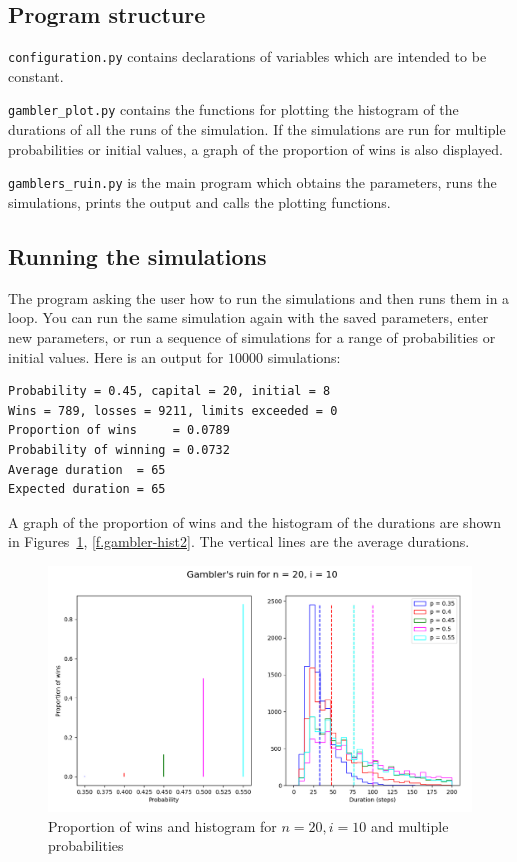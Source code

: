 \subsection{Program structure}

\verb+configuration.py+ contains declarations of variables which are intended to be constant.

\verb+gambler_plot.py+ contains the functions for plotting the histogram of the durations of all the runs of the simulation. If the simulations are run for multiple probabilities or initial values, a graph of the proportion of wins is also displayed.

\verb+gamblers_ruin.py+ is the main program which obtains the parameters, runs the simulations, prints the output and calls the plotting functions.

\subsection{Running the simulations}

The program asking the user how to run the simulations and then runs them in a loop. You can run the same simulation again with the saved parameters, enter new parameters, or run a sequence of simulations for a range of probabilities or initial values. Here is an output for $10000$ simulations:
\begin{verbatim}
Probability = 0.45, capital = 20, initial = 8
Wins = 789, losses = 9211, limits exceeded = 0
Proportion of wins     = 0.0789
Probability of winning = 0.0732
Average duration  = 65
Expected duration = 65
\end{verbatim}
A graph of the proportion of wins and the histogram of the durations are shown in Figures~\ref{f.gambler-hist1}, \ref{f.gambler-hist2}. The vertical lines are the average durations.

\begin{figure}
\begin{center}
\includegraphics[width=\textwidth]{gamblers-ruin-01}
\caption{Proportion of wins and histogram for $n=20, i=10$ and multiple probabilities}\label{f.gambler-hist1}
\end{center}
\end{figure}

